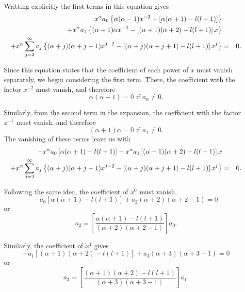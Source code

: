 Writting explicitly the first terms in this equation gives
\begin{eqnarray}
 x^\alpha a_0 \left\lbrace  \alpha(\alpha -1) x^{-2} - \left[ \alpha (\alpha +1) - l(l+1) \right] \right\rbrace & & \notag \\
 +x^\alpha a_1\left\lbrace   (\alpha + 1)\alpha  x^{ -1} - \left[ (\alpha + 1)(\alpha + 2) - l(l+1) \right] x \right\rbrace & &\notag \\
 +x^\alpha \sum_{j=2}^\infty a_j  \left\lbrace(\alpha + j)(\alpha + j-1) x^{ j-2} - \left[ (\alpha + j)(\alpha + j+1) - l(l+1) \right] x^{ j }  \right\rbrace &=& 0 \notag.
\end{eqnarray}

Since this equation states that the coefficient  of each power of $x$ must vanish separately, we begin considering the first term. There, the coefficient with the factor $x^{-2}$ must vanish, and therefore
\begin{equation}
\alpha(\alpha-1) = 0 \text{ if } a_0 \neq 0. \label{eq:alphaCondition1}
\end{equation}

Similarly, from the second term in the expansion,  the coefficient with the factor $x^{-1}$ must vanish, and therefore
\begin{equation}
(\alpha+1)\alpha = 0 \text{ if } a_1 \neq 0. \label{eq:alphaCondition2}
\end{equation}
The vanishing of these terms leave us with 
\begin{eqnarray}
 -x^\alpha a_0 \left[ \alpha (\alpha +1) - l(l+1) \right]  -x^\alpha a_1 \left[ (\alpha + 1)(\alpha + 2) - l(l+1) \right] x  & &\notag \\
 +x^\alpha \sum_{j=2}^\infty a_j  \left\lbrace(\alpha + j)(\alpha + j-1) x^{ j-2} - \left[ (\alpha + j)(\alpha + j+1) - l(l+1) \right] x^{ j }  \right\rbrace &=& 0 \notag.
\end{eqnarray}

Following the same idea, the coefficient of $x^0$ must vanish,
\begin{equation}
- a_0 \left[ \alpha (\alpha +1) - l(l+1) \right] +a_2  (\alpha + 2)(\alpha + 2-1) = 0
 \end{equation} 
or 
\begin{equation}
 a_2  =  \left[\frac{ \alpha (\alpha +1) - l(l+1)}{ (\alpha + 2)(\alpha + 2-1)  } \right] a_0.
 \end{equation}  
 
 Similarly, the coefficient of $x^1$ gives
 \begin{equation}
- a_1 \left[ (\alpha + 1)(\alpha + 2) - l(l+1) \right] + a_3  (\alpha + 3)(\alpha + 3-1) = 0
 \end{equation} 
or 
\begin{equation}
 a_3  =  \left[\frac{ (\alpha + 1)(\alpha + 2) - l(l+1) }{ (\alpha + 3)(\alpha + 3-1)  } \right] a_1.
 \end{equation} 

